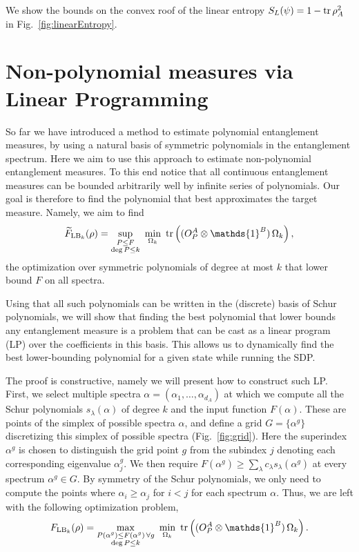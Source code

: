 \documentclass[aps,pra,onecolumn,superscriptaddress]{revtex4-2}
\newcommand{\one}{\mathds{1}}
\newcommand{\I}{\one}
\renewcommand{\a}{\alpha}
\begin{document}
We show the bounds on the convex roof of the linear entropy $S_L(\psi)=1-\tr\rho_A^2$ in Fig.~\ref{fig:linearEntropy}.



\section{Non-polynomial measures via Linear Programming}\label{sec:LP}

So far we have introduced a method to estimate polynomial entanglement measures, by using a natural basis of symmetric polynomials in the entanglement spectrum. Here we aim to use this approach to estimate non-polynomial entanglement measures. To this end notice that all continuous entanglement measures can be bounded arbitrarily well by infinite series of polynomials. Our goal is therefore to find the polynomial that best approximates the target measure. Namely, we aim to find
\begin{equation}\label{eq:FLBexact}
    \widetilde{F}_{{\rm LB}_k}(\rho)=\sup_{\substack{P\leq F\\ \deg P\leq k}}\ \min_{\Omega_k}\ \tr\left((O_P^A\otimes\I^B)\,\Omega_k\right),
\end{equation}
the optimization over symmetric polynomials of degree at most $k$ that lower bound $F$ on all spectra.

Using that all such polynomials can be written in the (discrete) basis of Schur polynomials, we will show that finding the best polynomial that lower bounds any entanglement measure is a problem that can be cast as a linear program (LP) over the coefficients in this basis. This allows us to dynamically find the best lower-bounding polynomial for a given state while running the SDP.

The proof is constructive, namely we will present how to construct such LP. First, we select multiple spectra $\a=(\a_1, \dots, \a_{d_A})$ at which we compute all the Schur polynomials $s_\lambda(\a)$ of degree $k$ and the input function $F(\a)$. These are points of the simplex of possible spectra $\alpha$, and define a grid $G=\{\a^g\}$ discretizing this simplex of possible spectra (Fig.~\ref{fig:grid}). Here the superindex $\a^g$ is chosen to distinguish the grid point $g$ from the subindex $j$ denoting each corresponding eigenvalue $\a^g_j$. We then require $F(\a^g) \geq \sum_\lambda c_\lambda s_\lambda(\a^g)$ at every spectrum $\a^g\in G$. By symmetry of the Schur polynomials, we only need to compute the points where $\a_i \geq \a_j$ for $i < j$ for each spectrum $\a$.
Thus, we are left with the following optimization problem,
\begin{equation}\label{eq:FLBgrid}
    F_{{\rm LB}_k}(\rho)=\max_{\substack{P(\a^g)\leq F(\a^g)\,\forall g\\ \deg P\leq k}}\ \min_{\Omega_k}\ \tr\left((O_P^A\otimes\I^B)\,\Omega_k\right).
\end{equation}
\end{document}
